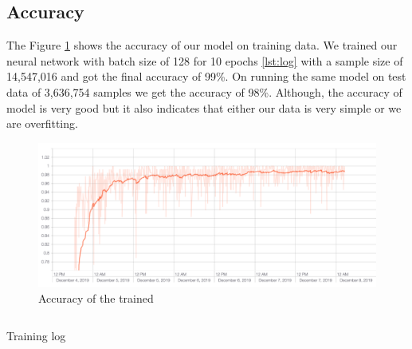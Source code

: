 \subsection{Accuracy}
The Figure \ref{fig:accuracy} shows the accuracy of our model on training data. We trained our neural network with batch size of 128 for 10 epochs \ref{lst:log} with a sample size of 14,547,016 and got the final accuracy of 99\%. On running the same model on test data of 3,636,754 samples we get the accuracy of 98\%. Although, the accuracy of model is very good but it also indicates that either our data is very simple or we are overfitting.
\begin{figure}[H]
  \centering
  \includegraphics[scale=0.40]{images/Chapter5/accuracy.png}
  \caption{Accuracy of the trained }
  \label{fig:accuracy}
\end{figure}

\begin{listing}
  \inputminted[frame=lines,framesep=2mm,baselinestretch=1.2,fontsize=\scriptsize,linenos]{text}{Chapter5/epoch.txt}
  \caption{Training log}
  \label{lst:log}
\end{listing}

